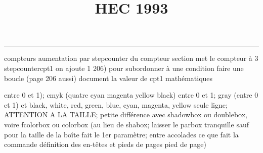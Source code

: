 \documentclass[11pt]{article}%
\title{\bf \vspace{-1cm} HEC 1993} %
\author{} %
\date{} %
\renewcommand{\headrulewidth}{0pt}%
\renewcommand{\footrulewidth}{0.4pt}%
\begin{document}
\maketitle %
\vspace{-1.2cm}\hrule %
\thispagestyle{fancy}

\vspace*{.4cm}


compteurs%
aumentation par stepcounter du compteur section%
met le compteur à 3%
stepcounter{cpt1} on ajoute 1%
206) pour subordonner à une condition %
faire une boucle (page 206 aussi) %
document la valeur de cpt1 
mathématiques\newcommand{\ch}{\operatorname{ch}} 
\newcommand{\sh}{\operatorname{sh}}
\renewcommand{\tanh}{\operatorname{th}}
\renewcommand{\sinh}{\operatorname{sh}}
\renewcommand{\cosh}{\operatorname{ch}}
\newcommand{\argsh}{\operatorname{argsh}}
\newcommand{\argch}{\operatorname{argch}}
\newcommand{\argth}{\operatorname{argth}}
\newcommand{\Id}{\operatorname{Id}}
\renewcommand{\leq}{\leq}
\renewcommand{\geq}{\geq }

\newcommand{\dlim}{\lim}
\newcommand{\dsum}{\sum}
\newcommand{\dprod}{\prod}



entre 0 et 1); cmyk (quatre cyan magenta yellow black) entre 0 et 1;
gray (entre 0 et 1) et black, white, red, green, blue, cyan, magenta,
yellow%
seule ligne; ATTENTION A LA TAILLE; petite différence avec shadowbox ou
doublebox, voire fcolorbox ou colorbox (au lieu de shabox; laisser le
parbox tranquille sauf pour la taille de la boîte
\newcommand{\Tbox}[1]{\begin{center} \shabox{\parbox{0.6
\linewidth}{#1}} \end{center}} %
fait le 1er paramètre; entre accolades ce que fait la commande
définition des en-têtes et pieds de pages\pagestyle{fancy}
\chead{}
\rfoot[ \ \thepage]{\thepage}
\cfoot{}
\lfoot{}
\thispagestyle{fancy} %
pied de page)\renewcommand{\footrulewidth}{0.4pt}
\renewcommand{\headrulewidth}{0.4pt}
\end{document}
